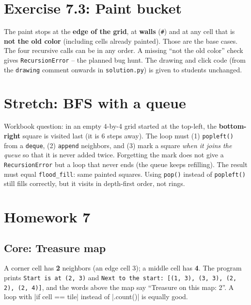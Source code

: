 \section{Exercise 7.3: Paint bucket}
\begin{answer}
The paint stops at the \textbf{edge of the grid}, at \textbf{walls} (\texttt{\#}) and at any cell that is \textbf{not the old color} (including cells already painted). Those are the base cases. The four recursive calls can be in any order. A missing \enquote{not the old color} check gives \texttt{RecursionError} -- the planned bug hunt. The drawing and click code (from the \texttt{drawing} comment onwards in \texttt{solution.py}) is given to students unchanged.
\end{answer}

\section{Stretch: BFS with a queue}
\begin{answer}
Workbook question: in an empty 4-by-4 grid started at the top-left, the \textbf{bottom-right} square is visited last (it is 6 steps away). The loop must (1) \texttt{popleft()} from a \texttt{deque}, (2) \texttt{append} neighbors, and (3) mark a square \emph{when it joins the queue} so that it is never added twice. Forgetting the mark does not give a \texttt{RecursionError} but a loop that never ends (the queue keeps refilling). The result must equal \texttt{flood\_fill}: same painted squares. Using \texttt{pop()} instead of \texttt{popleft()} still fills correctly, but it visits in depth-first order, not rings.
\end{answer}

\section{Homework 7}
\subsection{Core: Treasure map}
\begin{answer}[Core]
A corner cell has \textbf{2} neighbors (an edge cell 3); a middle cell has \textbf{4}. The program prints \texttt{Start is at (2, 3)} and \texttt{Next to the start: [(1, 3), (3, 3), (2, 2), (2, 4)]}, and the words above the map say \enquote{Treasure on this map: 2}. A loop with \py|if cell == tile| instead of \py|.count()| is equally good.
\end{answer}

